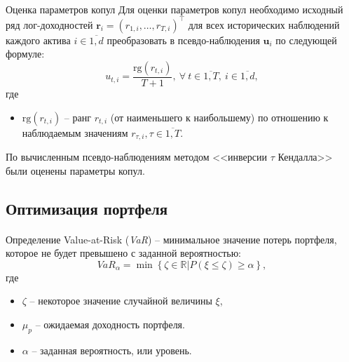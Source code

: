 \documentclass[aspectratio=169]{beamer}
\begin{document}
\begin{frame}{\insertsection}
    \framesubtitle{\insertsubsection}
    \begin{block}{Оценка параметров копул}
        Для оценки параметров копул необходимо исходный ряд лог-доходностей $\boldsymbol{r}_i = (r_{1,i}, \ldots, r_{T,i})^\intercal$ для всех исторических наблюдений каждого актива $i \in \overline{1,d}$ преобразовать в псевдо-наблюдения $\boldsymbol{u}_i$ по следующей формуле:
        \begin{equation}
            u_{t,i} = \frac{\text{rg}(r_{t,i})}{T + 1},\ \forall \ t \in \overline{1,T},\ i \in \overline{1,d},
        \end{equation}
        где
        \begin{itemize}
            \item $\text{rg}(r_{t,i})$ -- ранг $r_{t,i}$ (от наименьшего к наибольшему) по отношению к наблюдаемым значениям $r_{\tau,i}, \tau \in \overline{1,T}$.
        \end{itemize}
        По вычисленным псевдо-наблюдениям методом <<инверсии $\tau$ Кендалла>>~\cite{Koj2010} были оценены параметры копул.
    \end{block}
\end{frame}

\subsection{Оптимизация портфеля}

\begin{frame}{\insertsection}
    \framesubtitle{\insertsubsection}
    \begin{block}{Определение}
        Value-at-Risk (\textit{VaR}) -- минимальное значение потерь портфеля, которое не будет превышено с заданной вероятностью:
        \begin{equation}
            \textit{VaR}_\alpha = \min\left\{\zeta \in \mathbb{R}|P(\xi \le \zeta) \ge \alpha \right\},
        \end{equation}
        где
        \begin{itemize}
            \item $\zeta$ -- некоторое значение случайной величины $\xi$,
            \item $\mu_p$ -- ожидаемая доходность портфеля.
            \item $\alpha$ -- заданная вероятность, или уровень.
        \end{itemize}
    \end{block}
\end{frame}
\end{document}
